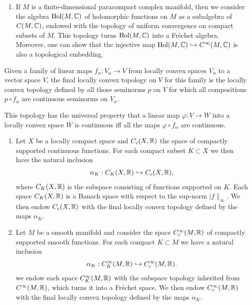 \begin{example}
\begin{enumerate}[label=(\alph*)]
        \item If $M$ is a finite-dimensional paracompact complex manifold, then we consider the algebra $\mathrm{Hol}(M,\mathbb{C})$ of holomorphic functions on $M$ as a subalgebra of $C(M,\mathbb{C})$, endowed with the topology of uniform convergence on compact subsets of $M$. This topology turns $\mathrm{Hol}(M,\mathbb{C})$ into a Fr\'echet algebra. Moreover, one can show that the injective map $\mathrm{Hol}(M,\mathbb{C})\hookrightarrow C^\infty(M,\mathbb{C})$ is also a topological embedding.
    \end{enumerate}
\end{example}

\begin{defn}
    Given a family of linear maps $f_\alpha:V_\alpha\to V$ from locally convex spaces $V_\alpha$ to a vector space $V$, the final locally convex topology on $V$ for this family is the locally convex topology defined by all those seminorms $p$ on $V$ for which all compositions $p\circ f_\alpha$ are continuous seminorms on $V_\alpha$.

    This topology has the universal property that a linear map $\varphi:V\to W$ into a locally convex space $W$ is continuous iff all the maps $\varphi\circ f_\alpha$ are continuous.
\end{defn}

\begin{example}
    \begin{enumerate}[label=(\alph*)]
        \item Let $X$ be a locally compact space and $C_c(X,\mathbb{R})$ the space of compactly supported continuous functions. For each compact subset $K\subset X$ we then have the natural inclusion
        \[\alpha_K: C_K(X,\mathbb{R})\hookrightarrow C_c(X,\mathbb{R}),\]
        where $C_K(X,\mathbb{R})$ is the subspace consisting of functions supported on $K$. Each space $C_K(X,\mathbb{R})$ is a Banach space with respect to the sup-norm $\lvert f\rVert_\infty$. We then endow $C_c(X,\mathbb{R})$ with the final locally convex topology defined by the maps $\alpha_K$.
        
        \item Let $M$ be a smooth manifold and consider the space $C_c^\infty(M,\mathbb{R})$ of compactly supported smooth functions. For each compact $K\subset M$ we have a natural inclusion
        \[\alpha_K: C_K^\infty(M,\mathbb{R})\hookrightarrow C_c^\infty(M,\mathbb{R}).\]
        we endow each space $C^\infty_K(M,\mathbb{R})$ with the subspace topology inherited from $C^\infty(M,\mathbb{R})$, which turns it into a Fr\'echet space. We then endow $C_c^\infty(M,\mathbb{R})$ with the final locally convex topology defined by the maps $\alpha_K$.
    \end{enumerate}
\end{example}

